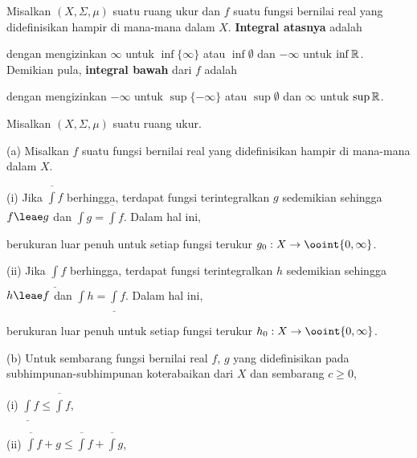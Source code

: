 

 Misalkan $(X,\Sigma,\mu)$
suatu ruang ukur dan $f$ suatu fungsi bernilai real yang didefinisikan hampir
di mana-mana dalam $X$. {\bf Integral atasnya} adalah


\noindent dengan mengizinkan $\infty$ untuk $\inf\{\infty\}$ atau
$\inf\emptyset$ dan $-\infty$ untuk $\inf\Bbb R$. Demikian pula,
{\bf integral bawah} dari $f$ adalah


\noindent dengan mengizinkan $-\infty$ untuk $\sup\{-\infty\}$ atau
$\sup\emptyset$ dan $\infty$ untuk $\sup\Bbb R$.

 Misalkan $(X,\Sigma,\mu)$ suatu
ruang ukur.

(a) Misalkan $f$ suatu fungsi bernilai real yang didefinisikan hampir di
mana-mana dalam $X$.

\quad (i) Jika $\overline{\int}f$ berhingga, terdapat fungsi terintegralkan
$g$ sedemikian sehingga $f\leae g$ dan $\int g=\overline{\int}f$. Dalam
hal ini,


\noindent berukuran luar penuh untuk setiap fungsi terukur
$g_0:X\to\ooint{0,\infty}$.

\quad (ii) Jika $\underline{\int}f$ berhingga, terdapat fungsi
terintegralkan $h$ sedemikian sehingga $h\leae f$ dan
$\int h=\underline{\int}f$. Dalam hal ini,


\noindent berukuran luar penuh untuk setiap fungsi terukur
$h_0:X\to\ooint{0,\infty}$.

{(b)} Untuk sembarang fungsi bernilai real $f$, $g$ yang didefinisikan pada
subhimpunan-subhimpunan koterabaikan dari $X$ dan sembarang $c\ge 0$,

\vskip 2pt

\quad(i) $\underline{\int}f\le\overline{\int}f$,

\vskip2pt

\quad (ii) $\overline{\int}f+g\le\overline{\int}f+\overline{\int}g$,

